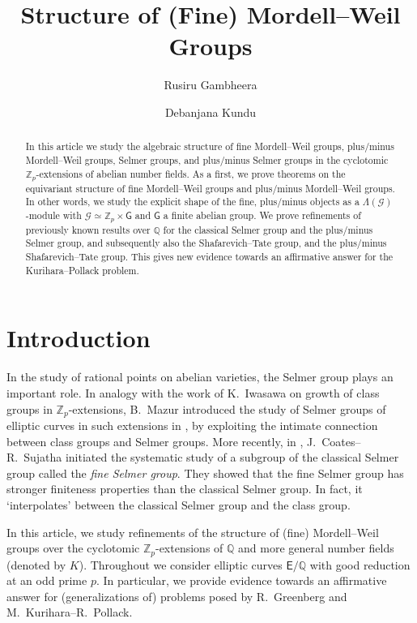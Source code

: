 \documentclass{amsart}
\title[]{Structure of (Fine) Mordell--Weil Groups}
\author[R.~Gambheera]{Rusiru Gambheera}
\author[D.~Kundu]{Debanjana Kundu}
\newcommand{\edit}[1]{\textcolor{black}{#1}}
\numberwithin{equation}{section}
\theoremstyle{remark}
\newcommand{\EC}{\mathsf{E}}
\newcommand{\cG}{\mathcal{G}}
\newcommand{\sG}{\mathsf{G}}
\newcommand{\Zp}{\mathbb{Z}_p}
\newcommand{\Q}{\mathbb{Q}}
\theoremstyle{plain} %
\begin{document}
\begin{abstract}
In this article we study the algebraic structure of fine Mordell--Weil groups, plus/minus Mordell--Weil groups, Selmer groups, and plus/minus Selmer groups in the cyclotomic $\Zp$-extensions of abelian number fields.
As a first, we prove theorems on the equivariant structure of fine Mordell--Weil groups and plus/minus Mordell--Weil groups.
In other words, we study the explicit shape of the fine, plus/minus objects as a $\Lambda(\cG)$-module with $\cG \simeq \Zp \times \sG$ and $\sG$ a finite abelian group.
We prove refinements of previously known results over $\Q$ for the classical Selmer group and the plus/minus Selmer group, and subsequently also the Shafarevich--Tate group, and the plus/minus Shafarevich--Tate group.
This gives new evidence towards an affirmative answer for the Kurihara--Pollack problem.
\end{abstract}



\bigskip
\bigskip
\maketitle

\section{Introduction}


In the study of rational points on \edit{a}belian varieties, the Selmer group plays an important role.
In analogy with the work of K.~Iwasawa on growth of class groups in $\Zp$-extensions, B.~Mazur introduced the study of Selmer groups of elliptic curves in such extensions in \cite{Maz72}, by exploiting the intimate connection between class groups and Selmer groups.
More recently, in \cite{CS05}, J.~Coates--R.~Sujatha initiated the systematic study of a subgroup of the classical Selmer group called the \emph{fine Selmer group}.
They showed that the fine Selmer group has stronger finiteness properties than the classical Selmer group.
In fact, it `interpolates' between the classical Selmer group and the class group.

In this article, we study refinements of the structure of (fine) Mordell--Weil groups over the cyclotomic $\Zp$-extensions of $\Q$ and more general number fields (denoted by $K$).
Throughout we consider elliptic curves $\EC/\Q$ with good reduction at an odd prime $p$.
In particular, we provide evidence towards an affirmative answer for (generalizations of) problems posed by R.~Greenberg and M.~Kurihara--R.~Pollack.
\end{document}

